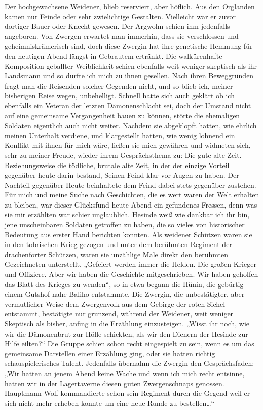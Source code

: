 Der hochgewachsene Weidener, blieb reserviert, aber höflich. Aus den Orglanden kamen nur Feinde oder sehr zwielichtige Gestalten. Vielleicht war er zuvor dortiger Bauer oder Knecht gewesen. Der Argwohn schien ihm jedenfalls angeboren. Von Zwergen erwartet man immerhin, dass sie verschlossen und geheimniskrämerisch sind, doch diese Zwergin hat ihre genetische Hemmung für den heutigen Abend längst in Gebrautem ertränkt. Die walkürenhafte Komposition geballter Weiblichkeit schien ebenfalls weit weniger skeptisch als ihr Landsmann und so durfte ich mich zu ihnen gesellen. Nach ihren Beweggründen fragt man die Reisenden solcher Gegenden nicht, und so blieb ich, meiner bisherigen Reise wegen, unbehelligt. Schnell hatte sich auch geklärt ob ich ebenfalls ein Veteran der letzten Dämonenschlacht sei, doch der Umstand nicht auf eine gemeinsame Vergangenheit bauen zu können, störte die ehemaligen Soldaten eigentlich auch nicht weiter. Nachdem sie abgeklopft hatten, wie ehrlich meinen Unterhalt verdiene, und klargestellt hatten, wie wenig lohnend ein Konflikt mit ihnen für mich wäre, ließen sie mich gewähren und widmeten sich, sehr zu meiner Freude, wieder ihrem Gesprächsthema zu: Die gute alte Zeit. Beziehungsweise die tödliche, brutale alte Zeit, in der der einzige Vorteil gegenüber heute darin bestand, Seinen Feind klar vor Augen zu haben. Der Nachteil gegenüber Heute beinhaltete dem Feind dabei stets gegenüber zustehen. Für mich und meine Suche nach Geschichten, die es wert waren der Welt erhalten zu bleiben, war dieser Glücksfund heute Abend ein gefundenes Fressen, denn was sie mir erzählten war schier unglaublich. Hesinde weiß wie dankbar ich ihr bin, jene unscheinbaren Soldaten getroffen zu haben, die so vieles von historischer Bedeutung aus erster Hand berichten konnten. Als weidener Schützen waren sie in den tobrischen Krieg gezogen und unter dem berühmten Regiment der drachenforter Schützen, waren sie unzählige Male direkt den berühmten Gezeichneten unterstellt. „Gefeiert werden immer die Helden. Die großen Krieger und Offiziere. Aber wir haben die Geschichte mitgeschrieben. Wir haben geholfen das Blatt des Krieges zu wenden“, so in etwa begann die Hünin, die gebürtig einem Gutshof nahe Baliho entstammte. Die Zwergin, die unbestätigter, aber vermutlicher Weise dem Zwergenvolk aus dem Gebirge der roten Sichel entstammt, bestätigte nur grunzend, während der Weidener, weit weniger Skeptisch als bisher, anfing in die Erzählung einzusteigen. „Wisst ihr noch, wie wir die Dämonenbrut zur Hölle schickten, als wir den Dienern der Hesinde zur Hilfe eilten?“ Die Gruppe schien schon recht eingespielt zu sein, wenn es um das gemeinsame Darstellen einer Erzählung ging, oder sie hatten richtig schauspielerisches Talent. Jedenfalls übernahm die Zwergin den Gesprächsfaden: „Wir hatten an jenem Abend keine Wache und wenn ich mich recht entsinne, hatten wir in der Lagertaverne diesen guten Zwergenschnaps genossen. Hauptmann Wolf kommandierte schon sein Regiment durch die Gegend weil er sich nicht mehr erheben konnte um eine neue Runde zu bestellen…“

